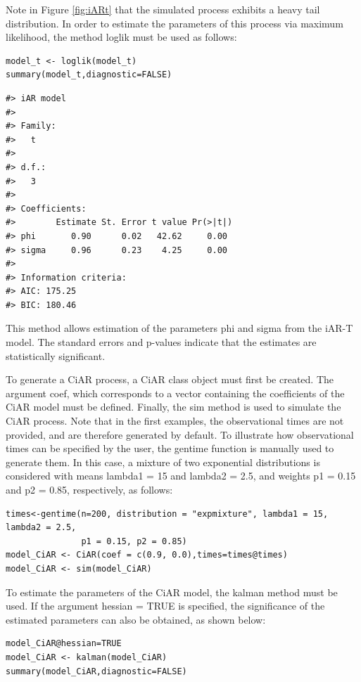 Note in Figure \ref{fig:iARt} that the simulated process exhibits a heavy tail distribution. In order to estimate the parameters of this process via maximum likelihood, the method loglik must be used as follows:

\begin{verbatim}
model_t <- loglik(model_t)
summary(model_t,diagnostic=FALSE)
\end{verbatim}

\begin{verbatim}
#> iAR model
#> 
#> Family:
#>   t 
#> 
#> d.f.:
#>   3 
#> 
#> Coefficients:
#>        Estimate St. Error t value Pr(>|t|)
#> phi       0.90      0.02   42.62     0.00
#> sigma     0.96      0.23    4.25     0.00
#> 
#> Information criteria:
#> AIC: 175.25 
#> BIC: 180.46
\end{verbatim}

This method allows estimation of the parameters phi and sigma from the iAR-T model. The standard errors and p-values indicate that the estimates are statistically significant.

To generate a CiAR process, a CiAR class object must first be created. The argument coef, which corresponds to a vector containing the coefficients of the CiAR model must be defined. Finally, the sim method is used to simulate the CiAR process. Note that in the first examples, the observational times are not provided, and are therefore generated by default. To illustrate how observational times can be specified by the user, the gentime function is manually used to generate them. In this case, a mixture of two exponential distributions is considered with means lambda1 = 15 and lambda2 = 2.5, and weights p1 = 0.15 and p2 = 0.85, respectively, as follows:

\begin{verbatim}
times<-gentime(n=200, distribution = "expmixture", lambda1 = 15, lambda2 = 2.5,
               p1 = 0.15, p2 = 0.85)
model_CiAR <- CiAR(coef = c(0.9, 0.0),times=times@times)
model_CiAR <- sim(model_CiAR)
\end{verbatim}

To estimate the parameters of the CiAR model, the kalman method must be used. If the argument hessian = TRUE is specified, the significance of the estimated parameters can also be obtained, as shown below:

\begin{verbatim}
model_CiAR@hessian=TRUE
model_CiAR <- kalman(model_CiAR)
summary(model_CiAR,diagnostic=FALSE)
\end{verbatim}

